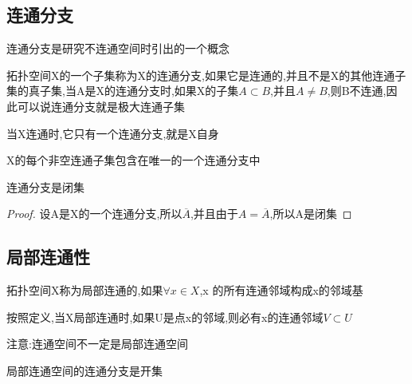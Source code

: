 \subsection*{连通分支}
连通分支是研究不连通空间时引出的一个概念
\begin{definition}
    拓扑空间X的一个子集称为X的连通分支,如果它是连通的,并且不是X的其他连通子集的真子集,当A是X的连通分支时,如果X的子集\(A \subset B \),并且\(A \neq B \),则B不连通,因此可以说连通分支就是极大连通子集
\end{definition}
\begin{note}
    当X连通时,它只有一个连通分支,就是X自身
\end{note}
\begin{corollary}
    X的每个非空连通子集包含在唯一的一个连通分支中
\end{corollary}
\begin{corollary}
    连通分支是闭集
\end{corollary}
\begin{proof}
    设A是X的一个连通分支,所以\(\overline{A}\),并且由于\(A =\overline{A}\),所以A是闭集
\end{proof}
\subsection*{局部连通性}
\begin{definition}
    拓扑空间X称为局部连通的,如果\(\forall x \in X \),x 的所有连通邻域构成x的邻域基
\end{definition}
按照定义,当X局部连通时,如果U是点x的邻域,则必有x的连通邻域\(V \subset U \)
\begin{note}
    注意:连通空间不一定是局部连通空间
\end{note}
\begin{corollary}
    局部连通空间的连通分支是开集
\end{corollary}
